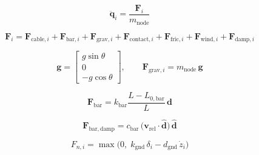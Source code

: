 

\begin{equation}
\label{eq:dynamics}
\ddot{\mathbf{q}}_i = \frac{\mathbf{F}_i}{m_{\mathrm{node}}}
\end{equation}

\begin{equation}
\label{eq:total_force}
\mathbf{F}_i = \mathbf{F}_{\mathrm{cable},i} + \mathbf{F}_{\mathrm{bar},i}
             + \mathbf{F}_{\mathrm{grav},i} + \mathbf{F}_{\mathrm{contact},i}
             + \mathbf{F}_{\mathrm{fric},i} + \mathbf{F}_{\mathrm{wind},i}
             + \mathbf{F}_{\mathrm{damp},i}
\end{equation}

\begin{equation}
\label{eq:gravity}
\mathbf{g} = \begin{bmatrix}
g\sin\theta \\ 0 \\ -g\cos\theta
\end{bmatrix}, \qquad
\mathbf{F}_{\mathrm{grav},i} = m_{\mathrm{node}}\,\mathbf{g}
\end{equation}

\begin{equation}
\label{eq:bar_force}
\mathbf{F}_{\mathrm{bar}} = k_{\mathrm{bar}}
\frac{L - L_{0,\mathrm{bar}}}{L}\,\mathbf{d}
\end{equation}

\begin{equation}
\label{eq:bar_damp}
\mathbf{F}_{\mathrm{bar,damp}} = c_{\mathrm{bar}}\,
\bigl(\mathbf{v}_{\mathrm{rel}} \cdot \hat{\mathbf{d}}\bigr)\,\hat{\mathbf{d}}
\end{equation}

\begin{equation}
\label{eq:contact_normal}
F_{n,i} = \max\!\bigl(0,\; k_{\mathrm{gnd}}\,\delta_i
          - d_{\mathrm{gnd}}\,\dot{z}_i\bigr)
\end{equation}

